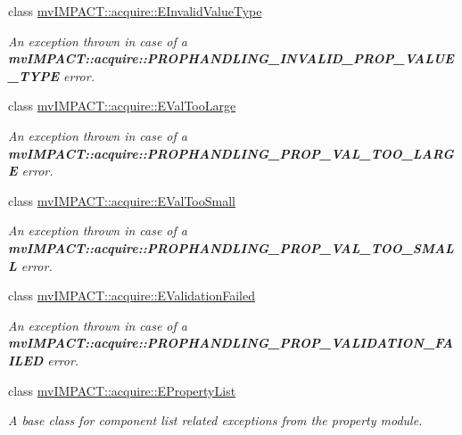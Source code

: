 \begin{DoxyCompactItemize}
class \hyperlink{classmv_i_m_p_a_c_t_1_1acquire_1_1_e_invalid_value_type}{mv\+I\+M\+P\+A\+C\+T\+::acquire\+::\+E\+Invalid\+Value\+Type}
\begin{DoxyCompactList}\small\item\em An exception thrown in case of a {\bfseries mv\+I\+M\+P\+A\+C\+T\+::acquire\+::\+P\+R\+O\+P\+H\+A\+N\+D\+L\+I\+N\+G\+\_\+\+I\+N\+V\+A\+L\+I\+D\+\_\+\+P\+R\+O\+P\+\_\+\+V\+A\+L\+U\+E\+\_\+\+T\+Y\+P\+E} error. \end{DoxyCompactList}\item 
class \hyperlink{classmv_i_m_p_a_c_t_1_1acquire_1_1_e_val_too_large}{mv\+I\+M\+P\+A\+C\+T\+::acquire\+::\+E\+Val\+Too\+Large}
\begin{DoxyCompactList}\small\item\em An exception thrown in case of a {\bfseries mv\+I\+M\+P\+A\+C\+T\+::acquire\+::\+P\+R\+O\+P\+H\+A\+N\+D\+L\+I\+N\+G\+\_\+\+P\+R\+O\+P\+\_\+\+V\+A\+L\+\_\+\+T\+O\+O\+\_\+\+L\+A\+R\+G\+E} error. \end{DoxyCompactList}\item 
class \hyperlink{classmv_i_m_p_a_c_t_1_1acquire_1_1_e_val_too_small}{mv\+I\+M\+P\+A\+C\+T\+::acquire\+::\+E\+Val\+Too\+Small}
\begin{DoxyCompactList}\small\item\em An exception thrown in case of a {\bfseries mv\+I\+M\+P\+A\+C\+T\+::acquire\+::\+P\+R\+O\+P\+H\+A\+N\+D\+L\+I\+N\+G\+\_\+\+P\+R\+O\+P\+\_\+\+V\+A\+L\+\_\+\+T\+O\+O\+\_\+\+S\+M\+A\+L\+L} error. \end{DoxyCompactList}\item 
class \hyperlink{classmv_i_m_p_a_c_t_1_1acquire_1_1_e_validation_failed}{mv\+I\+M\+P\+A\+C\+T\+::acquire\+::\+E\+Validation\+Failed}
\begin{DoxyCompactList}\small\item\em An exception thrown in case of a {\bfseries mv\+I\+M\+P\+A\+C\+T\+::acquire\+::\+P\+R\+O\+P\+H\+A\+N\+D\+L\+I\+N\+G\+\_\+\+P\+R\+O\+P\+\_\+\+V\+A\+L\+I\+D\+A\+T\+I\+O\+N\+\_\+\+F\+A\+I\+L\+E\+D} error. \end{DoxyCompactList}\item 
class \hyperlink{classmv_i_m_p_a_c_t_1_1acquire_1_1_e_property_list}{mv\+I\+M\+P\+A\+C\+T\+::acquire\+::\+E\+Property\+List}
\begin{DoxyCompactList}\small\item\em A base class for component list related exceptions from the property module. \end{DoxyCompactList}\item 

\end{DoxyCompactItemize}
